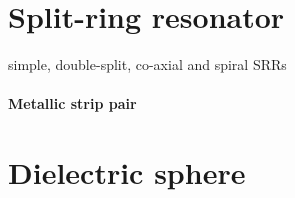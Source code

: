 %

\section{Split-ring resonator} \label{section_srr} %

simple, double-split, co-axial and spiral SRRs


\cite{li2009determination}


\paragraph{Metallic strip pair}



\section{Dielectric sphere} %



